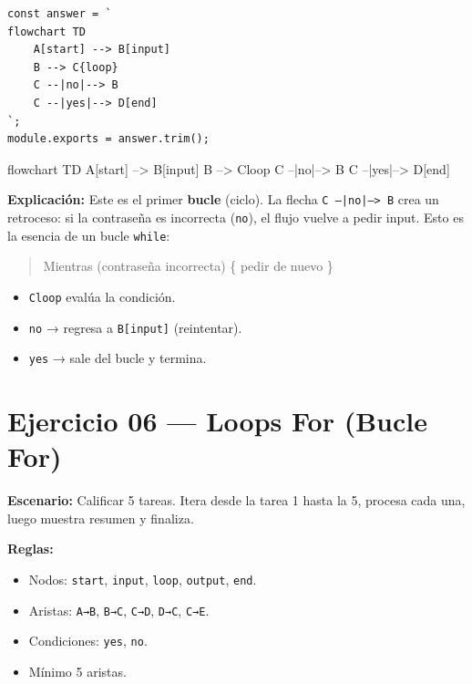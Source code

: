 \documentclass[10pt,a4paper]{article}
\newenvironment{mermaid}[1][]
  {%
   \begin{mdframed}[%
     linecolor=blue!50!black,
     backgroundcolor=blue!3,
     innertopmargin=6pt,
     innerbottommargin=6pt,
     leftmargin=0pt,
     rightmargin=0pt,
     skipabove=10pt,
     skipbelow=10pt,
     frametitle={Diagrama Mermaid},
     frametitlefont={\small\bfseries\color{blue!70!black}},
   ]%
   \small\ttfamily
  }
  {%
   \end{mdframed}%
  }
\begin{document}
\begin{lstlisting}[style=jsstyle]
const answer = `
flowchart TD
    A[start] --> B[input]
    B --> C{loop}
    C --|no|--> B
    C --|yes|--> D[end]
`;
module.exports = answer.trim();
\end{lstlisting}

\begin{mermaid}
flowchart TD
    A[start] --> B[input]
    B --> C{loop}
    C --|no|--> B
    C --|yes|--> D[end]
\end{mermaid}

\textbf{Explicación:}
Este es el primer \textbf{bucle} (ciclo). La flecha \texttt{C --|no|--> B}
crea un retroceso: si la contraseña es incorrecta (\texttt{no}), el
flujo vuelve a pedir input. Esto es la esencia de un bucle
\texttt{while}:

\begin{quote}
Mientras (contraseña incorrecta) \{ pedir de nuevo \}
\end{quote}

\begin{itemize}
  \item \texttt{C{loop}} evalúa la condición.
  \item \texttt{no} → regresa a \texttt{B[input]} (reintentar).
  \item \texttt{yes} → sale del bucle y termina.
\end{itemize}

\newpage

\section{Ejercicio 06 — Loops For (Bucle For)}

\textbf{Escenario:} Calificar 5 tareas. Itera desde la tarea 1 hasta la
5, procesa cada una, luego muestra resumen y finaliza.

\textbf{Reglas:}
\begin{itemize}
  \item Nodos: \texttt{start}, \texttt{input}, \texttt{loop},
        \texttt{output}, \texttt{end}.
  \item Aristas: \texttt{A→B}, \texttt{B→C}, \texttt{C→D},
        \texttt{D→C}, \texttt{C→E}.
  \item Condiciones: \texttt{yes}, \texttt{no}.
  \item Mínimo 5 aristas.
\end{itemize}
\end{document}
